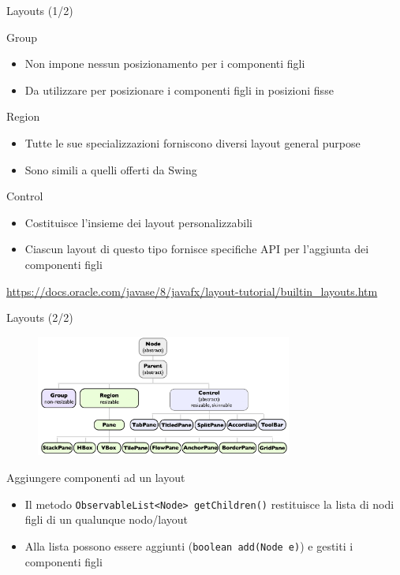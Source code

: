 \documentclass[presentation]{beamer}
\begin{document}
\begin{frame}{Layouts (1/2)}
\begin{block}{Group}
\begin{itemize}
\item Non impone nessun posizionamento per i componenti figli
\item Da utilizzare per posizionare i componenti figli in posizioni fisse
\end{itemize}
\end{block}

\begin{block}{Region}
\begin{itemize}
\item Tutte le sue specializzazioni forniscono diversi layout general purpose 
\item Sono simili a quelli offerti da Swing
\end{itemize}
\end{block}

\begin{block}{Control}
\begin{itemize}
\item Costituisce l'insieme dei layout personalizzabili
\item Ciascun layout di questo tipo fornisce specifiche API per l'aggiunta dei componenti figli
\end{itemize}
\end{block}
\url{https://docs.oracle.com/javase/8/javafx/layout-tutorial/builtin_layouts.htm}
\end{frame}

\begin{frame}{Layouts (2/2)}
\begin{figure}
\includegraphics[width=0.75\textwidth]{img/layouts.png}
\end{figure}

\begin{block}{Aggiungere componenti ad un layout}
\begin{itemize}
\item Il metodo \texttt{ObservableList<Node> getChildren()} restituisce la lista di nodi figli di un qualunque nodo/layout
\item Alla lista possono essere aggiunti (\texttt{boolean add(Node e)}) e gestiti i componenti figli
\end{itemize}
\end{block}
\end{frame}
\end{document}
